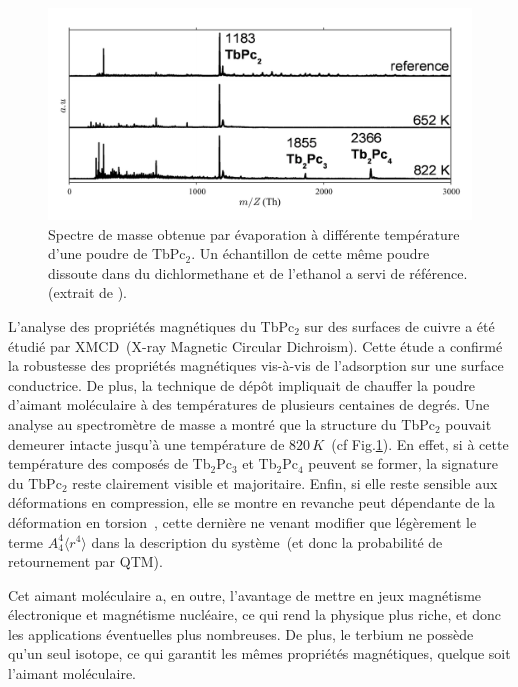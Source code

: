\begin{figure}
\centering \includegraphics[scale=0.45]{Resultats/TbPcResTemp/TbPcResTemp.pdf} 
\caption{Spectre de masse obtenue par évaporation à différente température d'une poudre de TbPc$_2$. Un échantillon de cette même poudre dissoute dans du dichlormethane et de l'ethanol a servi de référence. (extrait de \cite{Stepanow}).}
\label{SpectMass}
\end{figure}

L'analyse des propriétés magnétiques du TbPc$_{2}$ sur des surfaces de cuivre a été étudié par XMCD~(X-ray Magnetic Circular Dichroism). Cette étude a confirmé la robustesse des propriétés magnétiques vis-à-vis de l'adsorption sur une surface conductrice. De plus, la technique de dép\^ot impliquait de chauffer la poudre d'aimant moléculaire à des températures de plusieurs centaines de degrés. Une analyse au spectromètre de masse a montré que la structure du TbPc$_{2}$ pouvait demeurer intacte jusqu'à une température de $820\,K$~(cf Fig.\ref{SpectMass}). En effet, si à cette température des composés de Tb$_2$Pc$_3$ et Tb$_2$Pc$_4$ peuvent se former, la signature du TbPc$_2$ reste clairement visible et majoritaire. Enfin, si elle reste sensible aux déformations en compression, elle se montre en revanche peut dépendante de la déformation en torsion~\cite{Sorace2011}, cette dernière ne venant modifier que légèrement le terme $A_4^4 \langle r^4 \rangle$ dans la description du système~(et donc la probabilité de retournement par QTM).

Cet aimant moléculaire a, en outre, l'avantage de mettre en jeux magnétisme électronique et magnétisme nucléaire, ce qui rend la physique plus riche, et donc les applications éventuelles plus nombreuses. De plus, le terbium ne possède qu'un seul isotope, ce qui garantit les mêmes propriétés magnétiques, quelque soit l'aimant moléculaire.

